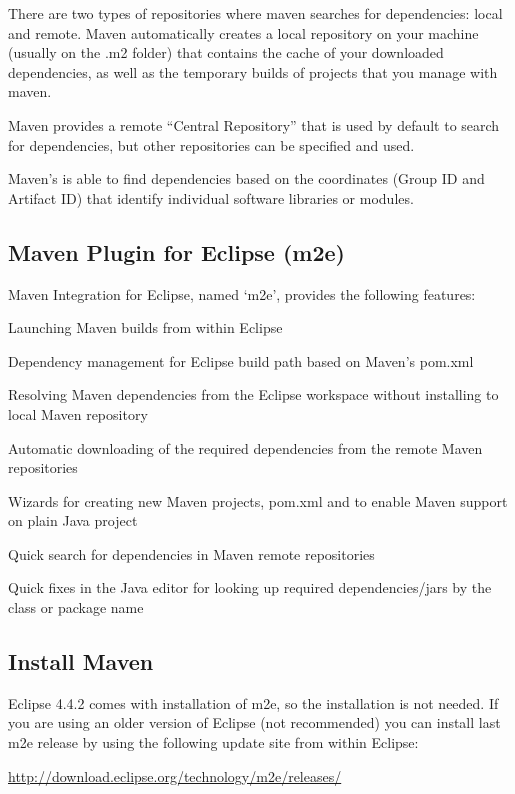 \documentclass{article}
\begin{document}
There are two types of repositories where maven searches for
dependencies: local and remote. Maven automatically creates a local
repository on your machine (usually on the .m2 folder) that contains
the cache of your downloaded dependencies, as well as the
temporary builds of projects that you manage with maven.

Maven provides a remote ``Central Repository''  that is used by default to search
for dependencies, but other repositories can be specified and used.

Maven's is able to find dependencies based on the coordinates (Group
ID and Artifact ID) that identify individual software libraries or
modules.

\subsection{Maven Plugin for Eclipse (m2e)}

Maven Integration for Eclipse, named `m2e', provides the following features:
\begin{compactitem}
\item Launching Maven builds from within Eclipse
\item Dependency management for Eclipse build path based on Maven's pom.xml
\item Resolving Maven dependencies from the Eclipse workspace without installing to local Maven repository
\item Automatic downloading of the required dependencies from the remote Maven repositories
\item Wizards for creating new Maven projects, pom.xml and to enable Maven support on plain Java project
\item Quick search for dependencies in Maven remote repositories
\item Quick fixes in the Java editor for looking up required dependencies/jars by the class or package name
\end{compactitem}

\subsection{Install Maven}
Eclipse 4.4.2 comes with installation of m2e, so the installation is
not needed. If you are using an older version of Eclipse (not
recommended) you can install last m2e release by using the following
update site from within Eclipse: 

\url{http://download.eclipse.org/technology/m2e/releases/}
\end{document}
